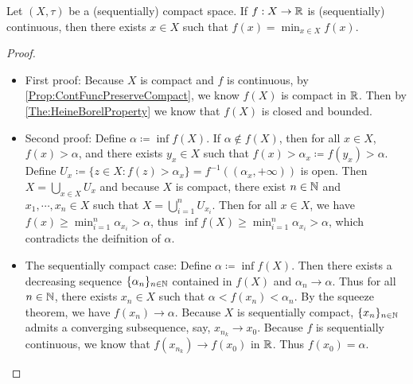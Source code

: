 \documentclass[screen]{techreport}
\numberwithin{equation}{section}
\begin{document}
\begin{theorem}\label{The:Weierstrass}
	Let $(X,\tau)$ be a (sequentially) compact space.
	If $f: X\to\mathbb{R}$ is (sequentially) continuous, then there exists $x \in X$ such that $f(x) = \min_{x \in X} f(x)$.
\end{theorem}
\begin{proof}
	\begin{itemize}
		\item First proof: Because $X$ is compact and $f$ is continuous, by \cref{Prop:ContFuncPreserveCompact}, we know $f(X)$ is compact in $\mathbb{R}$.
		Then by \cref{The:HeineBorelProperty} we know that $f(X)$ is closed and bounded.
		
		\item Second proof: Define $\alpha \coloneqq \inf f(X)$.
		If $\alpha \not\in f(X)$, then for all $x \in X$, $f(x) > \alpha$, and there exists $y_x \in X$ such that $f(x) > \alpha_x \coloneqq f(y_x) > \alpha$.
		Define $U_x \coloneqq \{ z \in X : f(z) > \alpha_x \} = f^{-1}((\alpha_x,+\infty))$ is open.
		Then $X = \bigcup_{x \in X} U_x$ and because $X$ is compact, there exist $n \in \mathbb{N}$ and $x_1,\cdots,x_n \in X$ such that $X = \bigcup_{i=1}^n U_{x_i}$.
		Then for all $x \in X$, we have $f(x) \ge \min_{i=1}^n \alpha_{x_i} > \alpha$, 
		thus $\inf f(X) \ge \min_{i=1}^n \alpha_{x_i} > \alpha$, which contradicts the deifnition of $\alpha$.
		
		\item The sequentially compact case: Define $\alpha \coloneqq \inf f(X)$.
		Then there exists a decreasing sequence $\{\alpha_n\}_{n \in \mathbb{N}}$ contained in $f(X)$ and $\alpha_n \rightarrow \alpha$.
		Thus for all $n \in \mathbb{N}$, there exists $x_n \in X$ such that $\alpha < f(x_n) < \alpha_n$.
		By the squeeze theorem, we have $f(x_n) \rightarrow \alpha$.
		Because $X$ is sequentially compact, $\{x_n\}_{n \in \mathbb{N}}$ admits a converging subsequence, say, $x_{n_k} \rightarrow x_0$.
		Because $f$ is sequentially continuous, we know that $f(x_{n_k}) \rightarrow f(x_0)$ in $\mathbb{R}$.
		Thus $f(x_0) = \alpha$.
	\end{itemize}
\end{proof}
\end{document}
